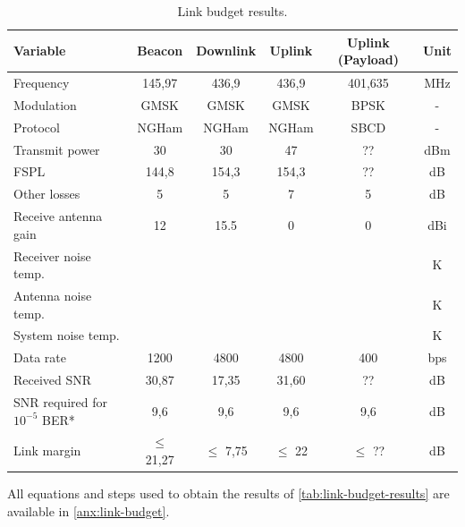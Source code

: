 \begin{table}[!h]
    \centering
    \begin{tabular}{L{0.3\textwidth}ccccc}
        \toprule[1.5pt]
        \textbf{Variable} & \textbf{Beacon} & \textbf{Downlink} & \textbf{Uplink} & \textbf{Uplink (Payload)} & \textbf{Unit}\\
        \midrule
        Frequency                       & 145,97    & 436,9     & 436,9     & 401,635   & MHz \\
        Modulation                      & GMSK      & GMSK      & GMSK      & BPSK      & - \\
        Protocol                        & NGHam     & NGHam     & NGHam     & SBCD      & - \\
        Transmit power                  & 30        & 30        & 47        & ??        & dBm \\
        FSPL                            & 144,8     & 154,3     & 154,3     & ??        & dB \\
        Other losses                    & 5         & 5         & 7         & 5         & dB \\
        Receive antenna gain            & 12        & 15.5      & 0         & 0         & dBi \\
        Receiver noise temp.            &           &           &           &           & K \\
        Antenna noise temp.             &           &           &           &           & K \\
        System noise temp.              &           &           &           &           & K \\
        Data rate                       & 1200      & 4800      & 4800      & 400       & bps \\
        Received SNR                    & 30,87     & 17,35     & 31,60     & ??        & dB \\
        SNR required for $10^{-5}$ BER*  & 9,6       & 9,6       & 9,6       & 9,6       & dB \\
        Link margin                     & $\leq$ 21,27 & $\leq$ 7,75 & $\leq$ 22 & $\leq$ ?? & dB \\
        \bottomrule[1.5pt]
    \end{tabular}
    \caption{Link budget results.}
    \label{tab:link-budget-results}
\end{table}

All equations and steps used to obtain the results of \autoref{tab:link-budget-results} are available in \autoref{anx:link-budget}.
